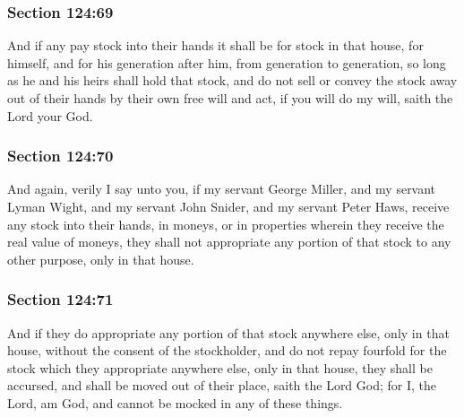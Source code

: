 	\subsubsection{Section 124:69} %
		\label{DC124-69}

		And if any pay stock into their hands it shall be for stock in that house, for himself, and for his generation after him, from generation to generation, so long as he and his heirs shall hold that stock, and do not sell or convey the stock away out of their hands by their own free will and act, if you will do my will, saith the Lord your God.


	\subsubsection{Section 124:70} %
		\label{DC124-70}

		And again, verily I say unto you, if my servant George Miller, and my servant Lyman Wight, and my servant John Snider, and my servant Peter Haws, receive any stock into their hands, in moneys, or in properties wherein they receive the real value of moneys, they shall not appropriate any portion of that stock to any other purpose, only in that house.


	\subsubsection{Section 124:71} %
		\label{DC124-71}

		And if they do appropriate any portion of that stock anywhere else, only in that house, without the consent of the stockholder, and do not repay fourfold for the stock which they appropriate anywhere else, only in that house, they shall be accursed, and shall be moved out of their place, saith the Lord God; for I, the Lord, am God, and cannot be mocked in any of these things.

